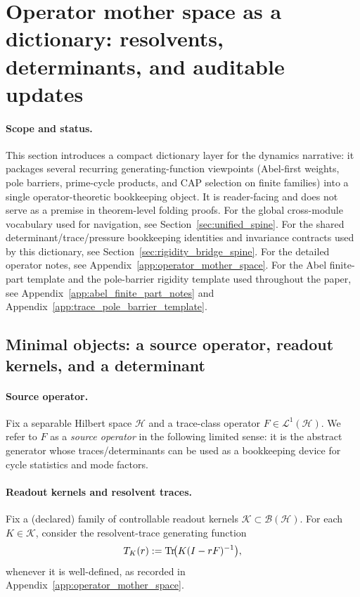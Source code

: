 \section{Operator mother space as a dictionary: resolvents, determinants, and auditable updates}
\label{app:operator_mother_space_dictionary}

\paragraph{Scope and status.}
\InterfaceTag This section introduces a compact dictionary layer for the dynamics narrative: it packages several recurring generating-function viewpoints (Abel-first weights, pole barriers, prime-cycle products, and CAP selection on finite families) into a single operator-theoretic bookkeeping object.
\AuditTag It is reader-facing and does not serve as a premise in theorem-level folding proofs.
For the global cross-module vocabulary used for navigation, see Section~\ref{sec:unified_spine}.
For the shared determinant/trace/pressure bookkeeping identities and invariance contracts used by this dictionary, see Section~\ref{sec:rigidity_bridge_spine}.
For the detailed operator notes, see Appendix~\ref{app:operator_mother_space}.
For the Abel finite-part template and the pole-barrier rigidity template used throughout the paper, see Appendix~\ref{app:abel_finite_part_notes} and Appendix~\ref{app:trace_pole_barrier_template}.

\subsection{Minimal objects: a source operator, readout kernels, and a determinant}
\label{subsec:operator_mother_space_dictionary_minimal}

\paragraph{Source operator.}
\InterfaceTag Fix a separable Hilbert space $\mathcal{H}$ and a trace-class operator $F\in\mathcal{L}^1(\mathcal{H})$.
We refer to $F$ as a \emph{source operator} in the following limited sense: it is the abstract generator whose traces/determinants can be used as a bookkeeping device for cycle statistics and mode factors.

\paragraph{Readout kernels and resolvent traces.}
\InterfaceTag Fix a (declared) family of controllable readout kernels $\mathcal{K}\subset \mathcal{B}(\mathcal{H})$.
For each $K\in\mathcal{K}$, consider the resolvent-trace generating function
\[
T_K(r):=\mathrm{Tr}\!\bigl(K(I-rF)^{-1}\bigr),
\]
whenever it is well-defined, as recorded in Appendix~\ref{app:operator_mother_space}.

